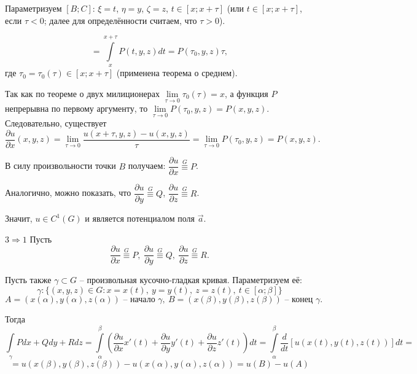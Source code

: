 \documentclass[12pt, a4paper, reqno]{article}
\begin{document}
    Параметризуем $[B; C]$: $\xi = t$, $\eta = y$, $\zeta = z$, $t \in [x; x + \tau]$ (или
    $t \in [x; x + \tau]$, если $\tau < 0$; далее для определённости считаем, что $\tau > 0$).

    \begin{equation*}
        \boxed{=} \int\limits_{x}^{x + \tau} P(t, y, z)dt = P(\tau_0, y, z) \tau,
    \end{equation*}
    где $\tau_0 = \tau_0(\tau) \in [x; x + \tau]$ (применена теорема о среднем).

    Так как по теореме о двух милиционерах $\lim\limits_{\tau \to 0} \tau_0(\tau) = x$, а
    функция $P$ непрерывна по первому аргументу, то $\lim\limits_{\tau \to 0} P(\tau_0, y, z) =
    P(x, y, z)$. Следовательно, существует
    \begin{equation*}
        \frac{\partial u}{\partial x}(x, y, z) =
        \lim\limits_{\tau \to 0} \frac{u(x + \tau, y, z) - u(x, y, z)}{\tau} =
        \lim\limits_{\tau \to 0} P(\tau_0, y, z) = P(x, y, z).
    \end{equation*}

    В силу произвольности точки $B$ получаем: $\dfrac{\partial u}{\partial x} \overset{G}{\equiv} P$.

    Аналогично, можно показать, что $\dfrac{\partial u}{\partial y} \overset{G}{\equiv} Q$,
    $\dfrac{\partial u}{\partial z} \overset{G}{\equiv} R$.

    Значит, $u \in C^1(G)$ и является потенциалом поля $\vec{a}$.

    $\boxed{3 \Rightarrow 1}$ Пусть
    \begin{equation*}
        \frac{\partial u}{\partial x} \overset{G}{\equiv} P,\
        \frac{\partial u}{\partial y} \overset{G}{\equiv} Q,\
        \frac{\partial u}{\partial z} \overset{G}{\equiv} R.
    \end{equation*}

    Пусть также $\gamma \subset G$ -- произвольная кусочно-гладкая кривая. Параметризуем её:
    \begin{equation*}
        \gamma: \{(x, y, z) \in G: x = x(t),\ y = y(t),\ z = z(t),\ t \in [\alpha; \beta]\}
    \end{equation*}
    \begin{equation*}
        A = (x(\alpha), y(\alpha), z(\alpha))\text{ -- начало }\gamma,\
        B = (x(\beta), y(\beta), z(\beta))\text{ -- конец }\gamma.
    \end{equation*}

    Тогда
    \begin{equation*}
        \int\limits_{\gamma} Pdx + Qdy + Rdz =
        \int\limits_{\alpha}^{\beta} \left(
            \frac{\partial u}{\partial x} x'(t) +
            \frac{\partial u}{\partial y} y'(t) +
            \frac{\partial u}{\partial z} z'(t)
        \right) dt =
        \int\limits_{\alpha}^{\beta} \frac{d}{dt} \left[u(x(t), y(t), z(t))\right] dt =
    \end{equation*}
    \begin{equation*}
        = u(x(\beta), y(\beta), z(\beta)) - u(x(\alpha), y(\alpha), z(\alpha)) =
        u(B) - u(A)
    \end{equation*}
\end{document}
